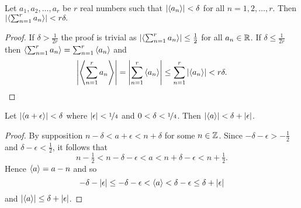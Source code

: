 \documentclass[journal]{IEEEtran}
\begin{document}
 \begin{lemma} \label{lem:fracpartsumanddelta}
 Let $a_1, a_2, \dots, a_r$ be $r$ real numbers such  that $\left|\left\langle a_n \right\rangle\right| < \delta$ for all $n = 1,2,\dots,r$.  Then $\left|\left\langle \sum_{n=1}^r{a_n} \right\rangle\right| < r\delta.$
 \end{lemma}
 \begin{proof}
 If $\delta > \tfrac{1}{2r}$ the proof is trivial as $\left|\left\langle \sum_{n=1}^r{a_n} \right\rangle\right| \leq \tfrac{1}{2}$ for all $a_n \in {\mathbb R}$.  If $\delta \leq \tfrac{1}{2r}$ then $\left\langle \sum_{n=1}^r{a_n} \right\rangle = \sum_{n=1}^r{\left\langle a_n \right\rangle}$ and
 \[
 \left\vert\left\langle \sum_{n=1}^r{a_n} \right\rangle\right\vert = \left\vert\sum_{n=1}^r{\left\langle a_n \right\rangle}\right\vert \leq \sum_{n=1}^r{\left\vert\left\langle a_n \right\rangle\right\vert} < r\delta.
 \]
 \end{proof}


\begin{lemma} \label{lem:fracpartinternalsumlessdelta}
Let $\left|\left\langle a + \epsilon \right\rangle\right| < \delta$ where $|\epsilon| < \nicefrac{1}{4}$ and $0<\delta<\nicefrac{1}{4}$. Then $\left|\left\langle a \right\rangle\right| < \delta + |\epsilon|$.
\end{lemma}
\begin{proof}
By supposition $n - \delta < a + \epsilon < n + \delta$ for some $n \in {\mathbb Z}$.  Since $-\delta - \epsilon > -\tfrac{1}{2}$ and $\delta - \epsilon < \tfrac{1}{2}$, it follows that
\[
n - \tfrac{1}{2} < n - \delta - \epsilon < a < n + \delta - \epsilon < n + \tfrac{1}{2}.
\]
Hence $\left\langle a \right\rangle = a - n$ and so
\[
-\delta - \left\vert \epsilon \right\vert \leq -\delta - \epsilon < \left\langle a \right\rangle < \delta - \epsilon \leq \delta + \left\vert \epsilon \right\vert
\]
and $\left\vert \left\langle a \right\rangle \right\vert \leq \delta + \left\vert \epsilon \right\vert$.

\end{proof}
\end{document}
